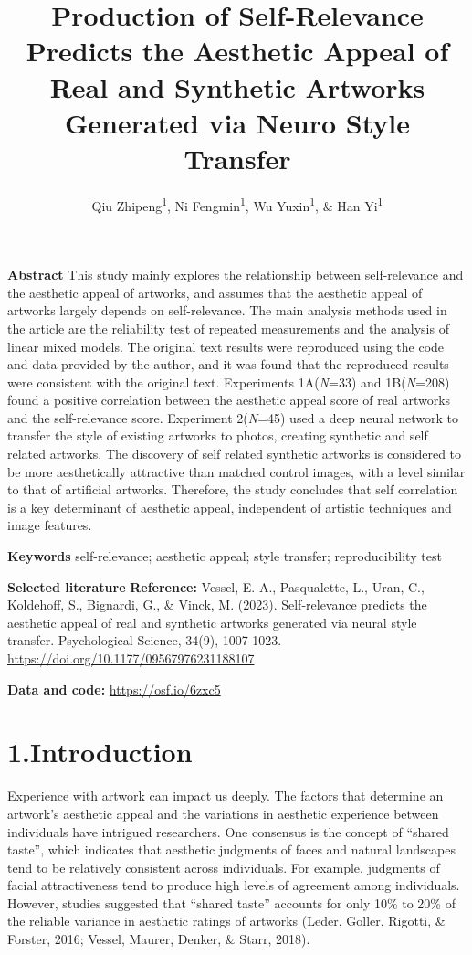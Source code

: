 \documentclass[
  man]{apa6}
\title{Production of Self-Relevance Predicts the Aesthetic Appeal of Real and Synthetic Artworks Generated via Neuro Style Transfer}
\author{Qiu Zhipeng\textsuperscript{1}, Ni Fengmin\textsuperscript{1}, Wu Yuxin\textsuperscript{1}, \& Han Yi\textsuperscript{1}}
\date{}
\affiliation{\vspace{0.5cm}\textsuperscript{1} Nanjing Normal Unviersity}
\begin{document}
\maketitle

\textbf{Abstract} This study mainly explores the relationship between self-relevance and the aesthetic appeal of artworks, and assumes that the aesthetic appeal of artworks largely depends on self-relevance. The main analysis methods used in the article are the reliability test of repeated measurements and the analysis of linear mixed models. The original text results were reproduced using the code and data provided by the author, and it was found that the reproduced results were consistent with the original text. Experiments 1A(\emph{N}=33) and 1B(\emph{N}=208) found a positive correlation between the aesthetic appeal score of real artworks and the self-relevance score. Experiment 2(\emph{N}=45) used a deep neural network to transfer the style of existing artworks to photos, creating synthetic and self related artworks. The discovery of self related synthetic artworks is considered to be more aesthetically attractive than matched control images, with a level similar to that of artificial artworks. Therefore, the study concludes that self correlation is a key determinant of aesthetic appeal, independent of artistic techniques and image features.

\textbf{Keywords} self-relevance; aesthetic appeal; style transfer; reproducibility test

\textbf{Selected literature}
\textbf{Reference:} Vessel, E. A., Pasqualette, L., Uran, C., Koldehoff, S., Bignardi, G., \& Vinck, M. (2023). Self-relevance predicts the aesthetic appeal of real and synthetic artworks generated via neural style transfer. Psychological Science, 34(9), 1007-1023. \url{https://doi.org/10.1177/09567976231188107}

\textbf{Data and code:} \url{https://osf.io/6zxc5}

\hypertarget{introduction}{%
\section{1.Introduction}\label{introduction}}

Experience with artwork can impact us deeply. The factors that determine an artwork's aesthetic appeal and the variations in aesthetic experience between individuals have intrigued researchers. One consensus is the concept of ``shared taste'', which indicates that aesthetic judgments of faces and natural landscapes tend to be relatively consistent across individuals. For example, judgments of facial attractiveness tend to produce high levels of agreement among individuals. However, studies suggested that ``shared taste'' accounts for only 10\% to 20\% of the reliable variance in aesthetic ratings of artworks (Leder, Goller, Rigotti, \& Forster, 2016; Vessel, Maurer, Denker, \& Starr, 2018).
\end{document}
